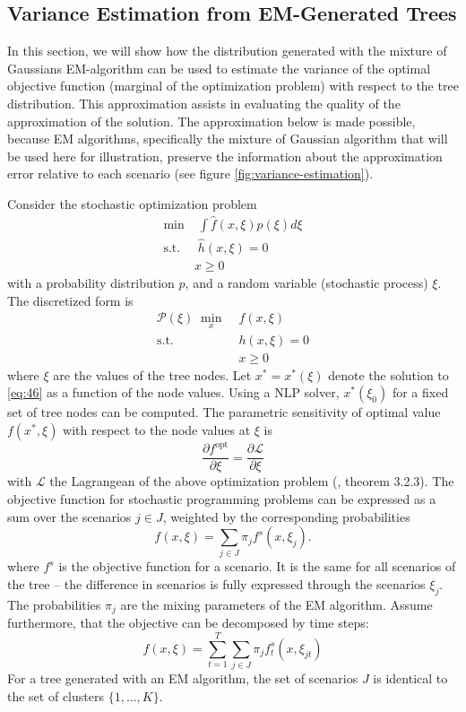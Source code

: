 \subsection{Variance Estimation from EM-Generated Trees}
\label{sec:variance-estimation}
In this section, we will show how the distribution generated with the mixture of Gaussians EM-algorithm can be used to estimate the variance of the optimal objective function (marginal of the optimization problem) with respect to the tree distribution.
This approximation assists in evaluating the quality of the approximation of the solution.
The approximation below is made possible, because EM algorithms, specifically the mixture of Gaussian algorithm that will be used here for illustration, preserve the information about the approximation error relative to each scenario (see figure \ref{fig:variance-estimation}).

Consider the stochastic optimization problem
\begin{align}
  \label{eq:49}
  \min&\;\int \hat{f}(x,\xi) p(\xi)d\xi\\
\text{s.t.}&\; \hat{h}(x,\xi) = 0\\
&x\geq 0
\end{align}
with a probability distribution $p$, and a random variable (stochastic process) $\xi$.
The discretized form is
\begin{align}
  \label{eq:46}
  \mathcal{P}(\xi)\; \min\limits_{x}&\; f(x,\xi)\\
\text{s.t.}&\; h(x,\xi) = 0\\
&\; x \geq 0
\end{align}
where $\xi$ are the values of the tree nodes.
Let $x^*=x^*(\xi)$ denote the solution to \eqref{eq:46} as a function of the node values.
Using a NLP solver, $x^*(\xi_0)$ for a fixed set of tree nodes can be computed.
The parametric sensitivity of optimal value $f(x^*,\xi)$ with respect to the node values at $\xi$ is
\begin{equation}
  \label{eq:47}
  \frac{\partial f^{\mathrm{opt}}}{\partial \xi} =  \frac{\partial \mathcal{L}}{\partial \xi}
\end{equation}
with $\mathcal{L}$ the Lagrangean of the above optimization problem (\cite{Jongen2004}, theorem 3.2.3).
The objective function for stochastic programming problems can be expressed as a sum over the scenarios $j\in J$, weighted by the corresponding probabilities
\begin{equation}
  \label{eq:45}
  f(x,\xi) = \sum_{j\in J} \pi_jf^s(x,\xi_j).
\end{equation}
where $f^s$ is the objective function for a scenario. It is the same for all scenarios of the tree -- the difference in scenarios is fully expressed through the scenarios $\xi_j$.
The probabilities $\pi_j$ are the mixing parameters of the EM algorithm.
Assume furthermore, that the objective can be decomposed by time steps:
\begin{equation}
  \label{eq:48}
  f(x,\xi) = \sum_{t=1}^T\sum_{j\in J}\pi_jf_{t}^s(x,\xi_{jt})
\end{equation}
For a tree generated with an EM algorithm, the set of scenarios $J$ is identical to the set of clusters $\{1,\ldots,K\}$.


